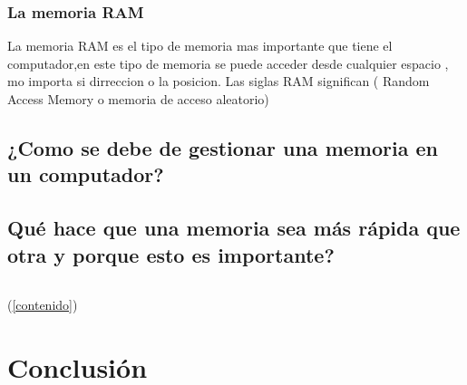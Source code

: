 \documentclass{article}
\begin{document}
        \subsubsection{La memoria RAM}
        La memoria RAM es el tipo de memoria mas importante que tiene el computador,en este tipo de memoria se puede acceder desde cualquier espacio , mo importa si dirreccion o la posicion. Las siglas RAM significan ( Random Access Memory o memoria de acceso aleatorio)
    \subsection{¿Como se debe de gestionar una memoria en un computador?}
    \subsection{Qué hace que una memoria sea más rápida que otra y porque esto es importante?}
    


\begin{lstlisting}

\end{lstlisting}

(\ref{contenido})

\section{Conclusión} \label{conclulsion}



\end{document}
